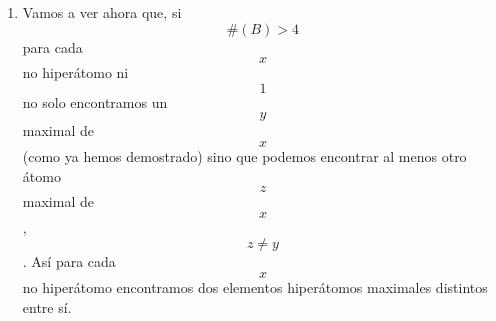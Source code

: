 \begin{enumerate}
\begin{enumerate}
\begin{enumerate}
\begin{enumerate}
\begin{enumerate}
          \begin{enumerate}
          \def\labelenumvi{\arabic{enumvi}.}
          \tightlist
          \item
            \[{y + \overline{y}} = 1\]
          \item
            \[{{x \cdot {({y + \overline{y}})}} = {x \cdot 1}} = x\]
          \item
            \[{{x = {{({x \cdot y})} + {({x \cdot \overline{y}})}}} = {{({x \cdot y})} + 0}} = y\]
          \item
            \[x = y\]. Absurdo. Habíamos asumido que
            \[{y \in \mathit{Atom}}{{{(B)} \land x} \notin \mathit{Atom}}{(B)}\].
          \end{enumerate}
        \end{enumerate}
      \item
        \[{{({x \cdot \overline{y}})} \cdot x} = {({x \cdot \overline{y}})}\]
      \item
        \[\exists{z \in \mathit{Atom}}{(B)}{{z \cdot {({x \cdot \overline{y}})}} = z}\]
      \item
        \[z \neq y\]

        \begin{enumerate}
        \def\labelenumv{\arabic{enumv}.}
        \tightlist
        \item
          Supongamos \[z = y\].
        \item
          \[{y = z} = {{({x \cdot \overline{y}})} \cdot z}\]
        \item
          \[{{{y = {{({{({x \cdot \overline{y}})} \cdot z})} \cdot y}} = {{({x \cdot z})} \cdot {({\overline{y} \cdot y})}}} = {{({x \cdot z})} \cdot 0}} = 0\]
        \item
          \[0 = y\]. Absurdo. Habíamos asumido que
          \[{y \in {B^{\ast} \land 0}} \notin B^{\ast}\].
        \end{enumerate}
      \item
        \[\exists{z \in {B \smallsetminus {\{ y\}}}}z\mathsf{\mathit{minimal}}x\].
      \item
        \[\exists{\mathit{yz} \in B}{{\left\lbrack {y\mathsf{\mathit{minimal}}x} \right\rbrack \land \left\lbrack {z\mathsf{\mathit{minimal}}x} \right\rbrack} \land \left\lbrack {y \neq x} \right\rbrack}\].
      \item
        \[\forall{x \in B^{\ast}}\exists{\mathit{yz} \in B}{{\left\lbrack {y\mathsf{\mathit{minimal}}x} \right\rbrack \land \left\lbrack {z\mathsf{\mathit{minimal}}x} \right\rbrack} \land \left\lbrack {y \neq x} \right\rbrack}\].
      \end{enumerate}
    \item
      Vamos a ver ahora que, si \[{\#{(B)}} > 4\] para cada \[x\] no
      hiperátomo ni \[1\] no solo encontramos un \[y\] maximal de
      \[x\](como ya hemos demostrado) sino que podemos encontrar al
      menos otro átomo \[z\] maximal de \[x\], \[z \neq y\]. Así para
      cada \[x\] no hiperátomo encontramos dos elementos hiperátomos
      maximales distintos entre sí.


\end{enumerate}
\end{enumerate}
\end{enumerate}
